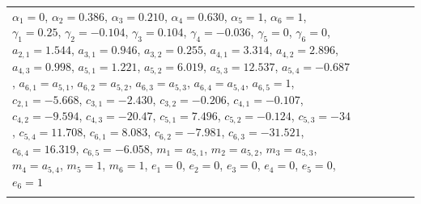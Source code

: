 \documentclass[twoside]{article}
\newcommand{\hhline}{\noalign{\vspace{1mm}}\hline\noalign{\vspace{1mm}}}
\begin{document}
\begin{table}
\begin{center}
\begin{tabular}{lcccp{1.5cm}p{9.5cm}}
  $\alpha_1 = 0$,
  $\alpha_2 = 0.386$,
  $\alpha_3 = 0.210$,
  $\alpha_4 = 0.630$,
  $\alpha_5 = 1$,
  $\alpha_6 = 1$,
  $\gamma_1 = 0.25$,
  $\gamma_2 = -0.104$,
  $\gamma_3 = 0.104$,
  $\gamma_4 = -0.036$,
  $\gamma_5 = 0$,
  $\gamma_6 = 0$,
  $a_{2,1} = 1.544$,
  $a_{3,1} = 0.946$,
  $a_{3,2} = 0.255$,
  $a_{4,1} = 3.314$,
  $a_{4,2} = 2.896$,
  $a_{4,3} = 0.998$,
  $a_{5,1} = 1.221$,
  $a_{5,2} = 6.019$,
  $a_{5,3} = 12.537$,
  $a_{5,4} = -0.687$,
  $a_{6,1} = a_{5,1}$,
  $a_{6,2} = a_{5,2}$,
  $a_{6,3} = a_{5,3}$,
  $a_{6,4} = a_{5,4}$,
  $a_{6,5} = 1$,
  $c_{2,1} = -5.668$,
  $c_{3,1} = -2.430$,
  $c_{3,2} = -0.206$,
  $c_{4,1} = -0.107$,
  $c_{4,2} = -9.594$,
  $c_{4,3} = -20.47$,
  $c_{5,1} = 7.496$,
  $c_{5,2} = -0.124$,
  $c_{5,3} = -34$,
  $c_{5,4} = 11.708$,
  $c_{6,1} = 8.083$,
  $c_{6,2} = -7.981$,
  $c_{6,3} = -31.521$,
  $c_{6,4} = 16.319$,
  $c_{6,5} = -6.058$,
  $m_1 = a_{5,1}$,
  $m_2 = a_{5,2}$,
  $m_3 = a_{5,3}$,
  $m_4 = a_{5,4}$,
  $m_5 = 1$,
  $m_6 = 1$,
  $e_1 = 0$,
  $e_2 = 0$,
  $e_3 = 0$,
  $e_4 = 0$,
  $e_5 = 0$,
  $e_6 = 1$\\
\hhline
\end{tabular}
\end{center}
\end{table}
\end{document}
